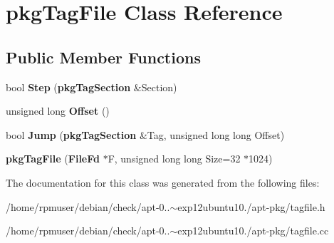 \section{pkg\-Tag\-File \-Class \-Reference}
\label{classpkgTagFile}
\subsection*{\-Public \-Member \-Functions}
\begin{DoxyCompactItemize}
\item 
bool {\bfseries \-Step} ({\bf pkg\-Tag\-Section} \&\-Section)\label{classpkgTagFile_a3de3d6b13a5c6c4ee7cb970f20faba77}

\item 
unsigned long {\bfseries \-Offset} ()\label{classpkgTagFile_aa99d9f0dbb0d6dc37bbce867d004f978}

\item 
bool {\bfseries \-Jump} ({\bf pkg\-Tag\-Section} \&\-Tag, unsigned long long \-Offset)\label{classpkgTagFile_af961393bbf3a4752b08fce7845bcdca5}

\item 
{\bfseries pkg\-Tag\-File} ({\bf \-File\-Fd} $\ast$\-F, unsigned long long \-Size=32 $\ast$1024)\label{classpkgTagFile_a8dc27d52e070eb6c1ebd9bdc76d83fb2}

\end{DoxyCompactItemize}


\-The documentation for this class was generated from the following files\-:\begin{DoxyCompactItemize}
\item 
/home/rpmuser/debian/check/apt-\/0..$\sim$exp12ubuntu10./apt-\/pkg/tagfile.\-h\item 
/home/rpmuser/debian/check/apt-\/0..$\sim$exp12ubuntu10./apt-\/pkg/tagfile.\-cc\end{DoxyCompactItemize}
